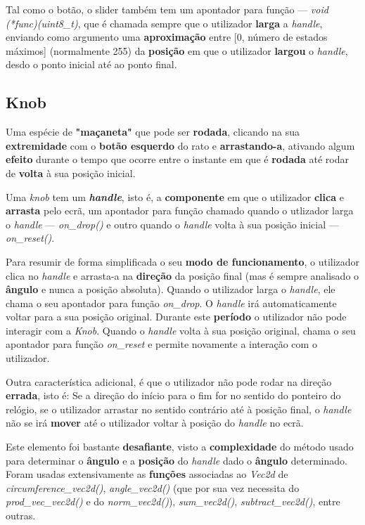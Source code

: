 \documentclass{report}
\begin{document}
Tal como o botão, o slider também tem um apontador para função --- \textit{void (*func)(uint8\_t)}, que é chamada sempre que o utilizador \textbf{larga} a \textit{handle}, enviando como argumento uma \textbf{aproximação} entre [0, número de estados máximos] (normalmente 255) da \textbf{posição} em que o utilizador \textbf{largou} o \textit{handle}, desdo o ponto inicial até ao ponto final.

\subsection{Knob}

Uma espécie de \textbf{"maçaneta"} que pode ser \textbf{rodada}, clicando na sua \textbf{extremidade} com o \textbf{botão esquerdo} do rato e \textbf{arrastando-a}, ativando algum \textbf{efeito} durante o tempo que ocorre entre o instante em que é \textbf{rodada} até rodar de \textbf{volta} à sua posição inicial.

Uma \textit{knob} tem um \textbf{\textit{handle}}, isto é, a \textbf{componente }em que o utilizador \textbf{clica} e \textbf{arrasta} pelo ecrã, um apontador para função chamado quando o utlizador larga o \textit{handle}  --- \textit{on\_drop()} e outro quando o \textit{handle} volta à sua posição inicial --- \textit{on\_reset()}.

Para resumir de forma simplificada o seu \textbf{modo de funcionamento}, o utilizador clica no \textit{handle} e arrasta-a na \textbf{direção} da posição final (mas é sempre analisado o \textbf{ângulo} e nunca a posição absoluta). Quando o utilizador larga o \textit{handle}, ele chama o seu apontador para função \textit{on\_drop}. O \textit{handle} irá automaticamente voltar para a sua posição original. Durante este \textbf{período} o utilizador não pode interagir com a \textit{Knob}. Quando o \textit{handle} volta à sua posição original, chama o seu apontador para função \textit{on\_reset} e permite novamente a interação com o utilizador.

Outra característica adicional, é que o utilizador não pode rodar na direção \textbf{errada}, isto é: Se a direção do início para o fim for no sentido do ponteiro do relógio, se o utilizador arrastar no sentido contrário até à posição final, o \textit{handle} não se irá \textbf{mover} até o utilizador voltar à posição do \textit{handle} no ecrã.

Este elemento foi bastante \textbf{desafiante}, visto a \textbf{complexidade} do método usado para determinar o \textbf{ângulo} e a \textbf{posição} do \textit{handle} dado o \textbf{ângulo} determinado. Foram usadas extensivamente as \textbf{funções} associadas ao \textit{Vec2d} de \textit{circumference\_vec2d()}, \textit{angle\_vec2d()} (que por sua vez necessita do \textit{prod\_vec\_vec2d()} e do \textit{norm\_vec2d()}), \textit{sum\_vec2d()}, \textit{subtract\_vec2d()}, entre outras.
\end{document}
